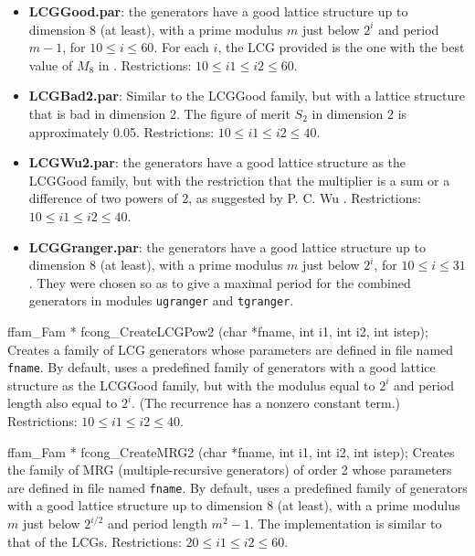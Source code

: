 \begin{itemize}
\item  {\bf LCGGood.par}: the generators have a good lattice structure up to
     dimension 8 (at least), with a prime modulus $m$ just below $2^i$ and
     period $m-1$, for $10 \le i \le 60$. For each $i$, the LCG provided
     is the one with the best value of $M_8$ in \cite{rLEC99c}.
     Restrictions: $10 \le i1 \le i2 \le 60$.


\item  {\bf LCGBad2.par}: Similar to the LCGGood family, but with a lattice
     structure that is bad in dimension 2. The figure of merit
     $S_2$ in dimension 2 is approximately 0.05.
     Restrictions: $10 \le i1 \le i2 \le 40$.

\item {\bf  LCGWu2.par}: the generators have a good lattice structure as the
     LCGGood family, but with the restriction that the multiplier is a sum
     or a difference of two powers of 2, as suggested by P. C. Wu
     \cite{rWU97a}. Restrictions: $ 10 \le i1 \le i2 \le 40$.

\item  {\bf LCGGranger.par}: the generators have a good lattice structure up
     to dimension 8 (at least), with a prime modulus $m$ just below $2^i$,
     for $10 \le i \le 31$. They were chosen so as to give a
     maximal period for the combined generators in modules {\tt ugranger}
     and {\tt tgranger}.
\end{itemize}
\endtab
\code


ffam_Fam * fcong_CreateLCGPow2 (char *fname, int i1, int i2, int istep);
\endcode
\tab
 Creates a family of LCG generators whose parameters are defined in file
 named {\tt fname}. By default, uses a predefined family of generators
 with a good lattice structure as the  LCGGood family, but with the modulus
 equal to $2^i$ and period
 length also equal to $2^i$. (The recurrence has a nonzero constant term.)
 Restrictions: $10 \le i1 \le i2 \le 40$.
\endtab
\code


ffam_Fam * fcong_CreateMRG2 (char *fname, int i1, int i2, int istep);
\endcode
\tab
 Creates the family of MRG (multiple-recursive generators) of order 2 whose
 parameters are defined in  file named {\tt fname}. By default, uses
 a predefined family of generators with
 a good lattice structure up to dimension 8 (at least), with a prime
 modulus $m$ just below $2^{i/2}$ and period length $m^2-1$.
 The implementation is similar to that of the LCGs.
 Restrictions: $ 20 \le i1 \le i2 \le 60$.
\endtab
\code


